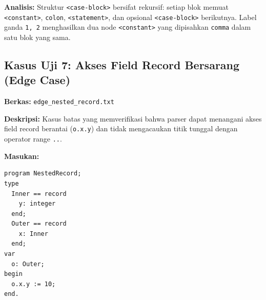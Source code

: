 \documentclass[12pt,a4paper]{article}
\begin{document}
\textbf{Analisis:} Struktur \texttt{<case-block>} bersifat rekursif: setiap blok memuat \texttt{<constant>}, \texttt{colon}, \texttt{<statement>}, dan opsional \texttt{<case-block>} berikutnya. Label ganda \texttt{1, 2} menghasilkan dua node \texttt{<constant>} yang dipisahkan \texttt{comma} dalam satu blok yang sama.

\subsection{Kasus Uji 7: Akses Field Record Bersarang (Edge Case)}
\textbf{Berkas:} \texttt{edge\_nested\_record.txt}

\textbf{Deskripsi:} Kasus batas yang memverifikasi bahwa parser dapat menangani akses field record berantai (\texttt{o.x.y}) dan tidak mengacaukan titik tunggal dengan operator range \texttt{..}.

\textbf{Masukan:}
\begin{lstlisting}[style=default]
program NestedRecord;
type
  Inner == record
    y: integer
  end;
  Outer == record
    x: Inner
  end;
var
  o: Outer;
begin
  o.x.y := 10;
end.
\end{lstlisting}
\end{document}
